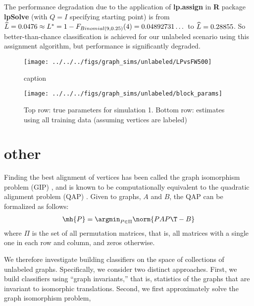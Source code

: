 The performance degradation due to the application of {\bf lp.assign} in {\bf R} package {\bf lpSolve} (with $Q=I$ specifying starting point) is
from $\widehat{L} = 0.0476 \approx L^* = 1-F_{Binomial(9,0.25)}(4) = 0.04892731\dots$ to $\widehat{L} = 0.28855$. So better-than-chance classification is
achieved for our unlabeled scenario using this assignment algorithm, but performance is significantly degraded.


\begin{figure}[htbp]
	\centering
		\texttt{[image: ../../../figs/graph\_sims/unlabeled/LPvsFW500]}
	\caption{caption}
	\label{fig:figs_Sims_unlabeled_LPvsFW500}
\end{figure}


\begin{figure}[!ht]
\centering \texttt{[image: ../../../figs/graph\_sims/unlabeled/block\_params]}
\caption{Top row: true parameters for simulation 1.  Bottom row: estimates using all training data (assuming vertices are labeled)
}
\label{fig:sim1_params}
\end{figure}










\section{other} %
\label{sec:other}





Finding the best alignment of vertices has been called the graph isomorphism problem (GIP) \cite{??}, and is known to be computationally equivalent to the quadratic alignment problem (QAP) \cite{??}.  Given to graphs, $A$ and $B$, the QAP can be formalized as follows:
\begin{align}
	\mh{P} = \argmin_{P \in \Pi} \norm{PAP\T - B}
\end{align}
where $\Pi$ is the set of all permutation matrices, that is, all matrices with a single one in each row and column, and zeros otherwise.  


We therefore investigate building classifiers on the space of collections of unlabeled graphs.  Specifically, we consider two distinct approaches. First, we build classifiers using ``graph invariants,'' that is, statistics of the graphs that are invariant to isomorphic translations.  Second, we first approximately solve the graph isomorphism problem,  





